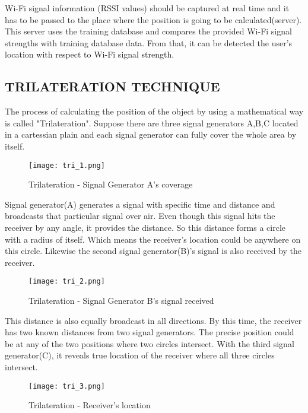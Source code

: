 \begin{enumerate}
		\subitem 
		Wi-Fi signal information (RSSI values) should be captured at real time and it has to be passed to  the place where the position is going to be calculated(server). This server uses the training database and compares the provided Wi-Fi signal strengths with training database data. From that, it can be detected the user's location with respect to Wi-Fi signal strength.
	\end{enumerate}


\subsection{TRILATERATION TECHNIQUE}
The process of calculating the position of the object by using a mathematical way is called "Trilateration".\cite{trilateration} Suppose there are three signal generators A,B,C located in a cartessian plain and each signal generator can fully cover the whole area by itself. 

		\begin{figure*}[h]	
			\centering
			\texttt{[image: tri\_1.png]}
			\caption{Trilateration - Signal Generator A's coverage }
		\end{figure*}

Signal generator(A) generates a signal with specific time and distance and broadcasts that particular signal over air. Even though this signal hits the receiver by any angle, it provides the distance. So this distance forms a circle with a radius of itself. Which means the receiver's location could be anywhere on this circle. Likewise the second signal generator(B)'s signal is also received by the receiver.

\begin{figure*}[h]	
	\centering
	\texttt{[image: tri\_2.png]}
	\caption{Trilateration - Signal Generator B's signal received }
\end{figure*}

This distance is also equally broadcast in all directions. By this time, the receiver has two known distances from two signal generators. The precise position could be at any of the two positions where two circles intersect. With the third signal generator(C), it reveals true location of the receiver where all three circles intersect.

\begin{figure*}[h]	
	\centering
	\texttt{[image: tri\_3.png]}
	\caption{Trilateration - Receiver's location }
\end{figure*}

